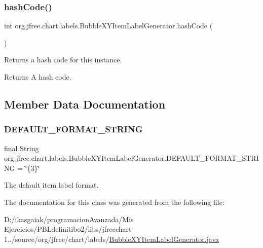 \subsubsection{\texorpdfstring{hash\+Code()}{hashCode()}}
{\footnotesize\ttfamily int org.\+jfree.\+chart.\+labels.\+Bubble\+X\+Y\+Item\+Label\+Generator.\+hash\+Code (\begin{DoxyParamCaption}{ }\end{DoxyParamCaption})}

Returns a hash code for this instance.

\begin{DoxyReturn}{Returns}
A hash code. 
\end{DoxyReturn}


\subsection{Member Data Documentation}
\mbox{\label{classorg_1_1jfree_1_1chart_1_1labels_1_1_bubble_x_y_item_label_generator_aed32b2340209861cb1b7f1fb084ea3e9}} 
\subsubsection{\texorpdfstring{D\+E\+F\+A\+U\+L\+T\+\_\+\+F\+O\+R\+M\+A\+T\+\_\+\+S\+T\+R\+I\+NG}{DEFAULT\_FORMAT\_STRING}}
{\footnotesize\ttfamily final String org.\+jfree.\+chart.\+labels.\+Bubble\+X\+Y\+Item\+Label\+Generator.\+D\+E\+F\+A\+U\+L\+T\+\_\+\+F\+O\+R\+M\+A\+T\+\_\+\+S\+T\+R\+I\+NG = \char`\"{}\{3\}\char`\"{}\hspace{0.3cm}{\ttfamily [static]}}

The default item label format. 

The documentation for this class was generated from the following file\+:\begin{DoxyCompactItemize}
\item 
D\+:/ikasgaiak/programacion\+Avanzada/\+Mis Ejercicios/\+P\+B\+Ldefinitibo2/libs/jfreechart-\/1../source/org/jfree/chart/labels/\mbox{\hyperlink{_bubble_x_y_item_label_generator_8java}{Bubble\+X\+Y\+Item\+Label\+Generator.\+java}}\end{DoxyCompactItemize}
